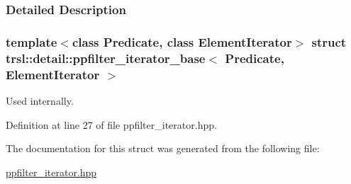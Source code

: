 \subsubsection{Detailed Description}
\subsubsection*{template$<$class Predicate, class ElementIterator$>$ struct trsl::detail::ppfilter\_\-iterator\_\-base$<$ Predicate, ElementIterator $>$}

Used internally. 

Definition at line 27 of file ppfilter\_\-iterator.hpp.

The documentation for this struct was generated from the following file:\begin{DoxyCompactItemize}
\item 
\hyperlink{ppfilter__iterator_8hpp}{ppfilter\_\-iterator.hpp}\end{DoxyCompactItemize}
